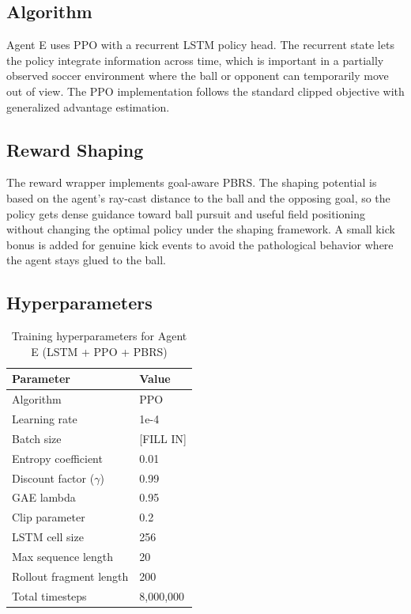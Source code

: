 \documentclass{article}
\begin{document}
\subsection{Algorithm}
Agent E uses PPO with a recurrent LSTM policy head. The recurrent state lets the policy integrate information across time, which is important in a partially observed soccer environment where the ball or opponent can temporarily move out of view. The PPO implementation follows the standard clipped objective with generalized advantage estimation.

\subsection{Reward Shaping}
The reward wrapper implements goal-aware PBRS. The shaping potential is based on the agent's ray-cast distance to the ball and the opposing goal, so the policy gets dense guidance toward ball pursuit and useful field positioning without changing the optimal policy under the shaping framework. A small kick bonus is added for genuine kick events to avoid the pathological behavior where the agent stays glued to the ball.

\subsection{Hyperparameters}
\begin{table}[h]
\centering
\caption{Training hyperparameters for Agent E (LSTM + PPO + PBRS)}
\label{tab:hyperparams}
\begin{tabular}{|l|l|}
\hline
\textbf{Parameter} & \textbf{Value} \\
\hline
Algorithm & PPO \\
Learning rate & 1e-4 \\
Batch size & [FILL IN] \\
Entropy coefficient & 0.01 \\
Discount factor ($\gamma$) & 0.99 \\
GAE lambda & 0.95 \\
Clip parameter & 0.2 \\
LSTM cell size & 256 \\
Max sequence length & 20 \\
Rollout fragment length & 200 \\
Total timesteps & 8,000,000 \\
\hline
\end{tabular}
\end{table}
\end{document}
